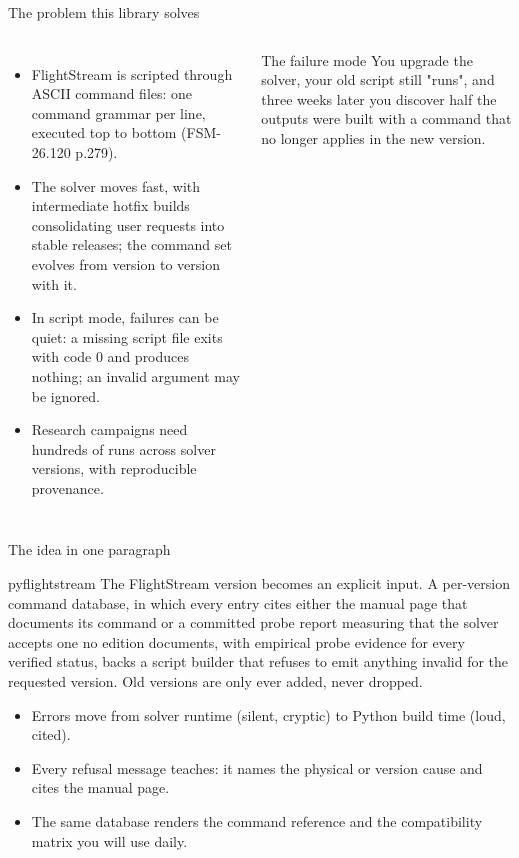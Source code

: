 \documentclass[aspectratio=169,10pt]{beamer}
\begin{document}
\begin{frame}{The problem this library solves}
  \begin{columns}[T]
    \begin{itemize}
      \item FlightStream is scripted through ASCII command files: one command grammar per line, executed top to bottom (FSM-26.120 p.279).
      \item The solver moves fast, with intermediate hotfix builds consolidating user requests into stable releases; the command set evolves from version to version with it.
      \item In script mode, failures can be quiet: a missing script file exits with code 0 and produces nothing; an invalid argument may be ignored.
      \item Research campaigns need hundreds of runs across solver versions, with reproducible provenance.
    \end{itemize}
    \begin{alertblock}{The failure mode}
      You upgrade the solver, your old script still "runs", and three weeks later you discover half the outputs were built with a command that no longer applies in the new version.
    \end{alertblock}
  \end{columns}
\end{frame}

\begin{frame}{The idea in one paragraph}
  \begin{block}{pyflightstream}
    The FlightStream version becomes an explicit input. A per-version command database, in which every entry cites either the manual page that documents its command or a committed probe report measuring that the solver accepts one no edition documents, with empirical probe evidence for every verified status, backs a script builder that refuses to emit anything invalid for the requested version. Old versions are only ever added, never dropped.
  \end{block}
  \begin{itemize}
    \item Errors move from solver runtime (silent, cryptic) to Python build time (loud, cited).
    \item Every refusal message teaches: it names the physical or version cause and cites the manual page.
    \item The same database renders the command reference and the compatibility matrix you will use daily.
  \end{itemize}
\end{frame}
\end{document}
